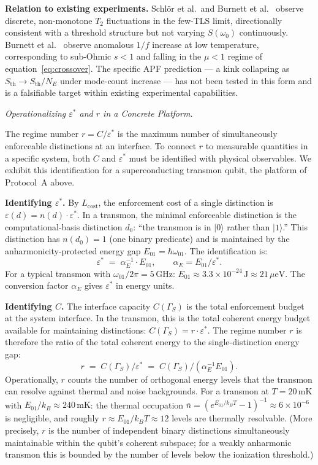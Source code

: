 \documentclass[11pt]{article}
\theoremstyle{remark}
\begin{document}
\medskip\noindent\textbf{Relation to existing experiments.}  Schl\"or et al.\ and Burnett et al.~\cite{Burnett2019npj} observe discrete, non-monotone $T_2$ fluctuations in the few-TLS limit, directionally consistent with a threshold structure but not varying $S(\omega_0)$ continuously.  Burnett et al.~\cite{Burnett2014NComms} observe anomalous $1/f$ increase at low temperature, corresponding to sub-Ohmic $s < 1$ and falling in the $\mu < 1$ regime of equation~\eqref{eq:crossover}.  The specific APF prediction --- a kink collapsing as $S_{\mathrm{th}} \to S_{\mathrm{th}}/N_E$ under mode-count increase --- has not been tested in this form and is a falsifiable target within existing experimental capabilities.



\medskip\noindent\textit{Operationalizing $\varepsilon^*$ and $r$ in a Concrete Platform.}
\label{box:operationalize_r}

The regime number $r = C/\varepsilon^*$ is the maximum number of simultaneously enforceable distinctions at an interface.  To connect $r$ to measurable quantities in a specific system, both $C$ and $\varepsilon^*$ must be identified with physical observables.  We exhibit this identification for a superconducting transmon qubit, the platform of Protocol~A above.

\medskip\noindent\textbf{Identifying $\varepsilon^*$.}  By $L_{\mathrm{cost}}$, the enforcement cost of a single distinction is $\varepsilon(d) = n(d) \cdot \varepsilon^*$.  In a transmon, the minimal enforceable distinction is the computational-basis distinction $d_0$: ``the transmon is in $|0\rangle$ rather than $|1\rangle$.''  This distinction has $n(d_0) = 1$ (one binary predicate) and is maintained by the anharmonicity-protected energy gap $E_{01} = \hbar\omega_{01}$.  The identification is:
\[
\varepsilon^* \;=\; \alpha_E^{-1} \cdot E_{01}, \qquad \alpha_E = E_{01}/\varepsilon^*.
\]
For a typical transmon with $\omega_{01}/2\pi = 5\,\mathrm{GHz}$: $E_{01} \approx 3.3 \times 10^{-24}\,\mathrm{J} \approx 21\,\mu\mathrm{eV}$.  The conversion factor $\alpha_E$ gives $\varepsilon^*$ in energy units.

\medskip\noindent\textbf{Identifying $C$.}  The interface capacity $C(\Gamma_S)$ is the total enforcement budget at the system interface.  In the transmon, this is the total coherent energy budget available for maintaining distinctions: $C(\Gamma_S) = r \cdot \varepsilon^*$.  The regime number $r$ is therefore the ratio of the total coherent energy to the single-distinction energy gap:
\[
r \;=\; C(\Gamma_S)/\varepsilon^* \;=\; C(\Gamma_S) / (\alpha_E^{-1} E_{01}).
\]
Operationally, $r$ counts the number of orthogonal energy levels that the transmon can resolve against thermal and noise backgrounds.  For a transmon at $T = 20\,\mathrm{mK}$ with $E_{01}/k_B \approx 240\,\mathrm{mK}$: the thermal occupation $\bar{n} = (e^{E_{01}/k_BT} - 1)^{-1} \approx 6 \times 10^{-6}$ is negligible, and roughly $r \approx E_{01}/k_BT \approx 12$ levels are thermally resolvable.  (More precisely, $r$ is the number of independent binary distinctions simultaneously maintainable within the qubit's coherent subspace; for a weakly anharmonic transmon this is bounded by the number of levels below the ionization threshold.)
\end{document}
